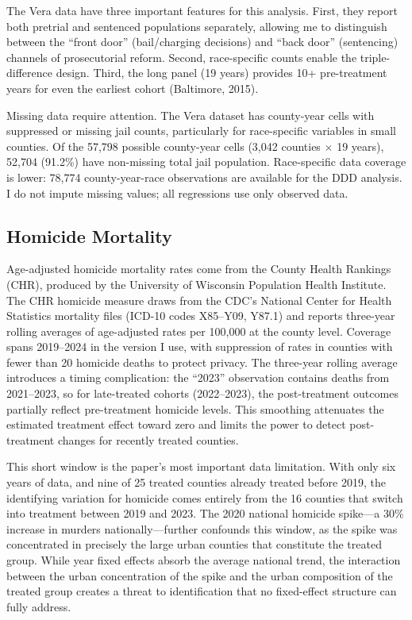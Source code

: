 \documentclass[12pt]{article}
\begin{document}
The Vera data have three important features for this analysis. First, they report both pretrial and sentenced populations separately, allowing me to distinguish between the ``front door'' (bail/charging decisions) and ``back door'' (sentencing) channels of prosecutorial reform. Second, race-specific counts enable the triple-difference design. Third, the long panel (19 years) provides 10+ pre-treatment years for even the earliest cohort (Baltimore, 2015).

Missing data require attention. The Vera dataset has county-year cells with suppressed or missing jail counts, particularly for race-specific variables in small counties. Of the 57,798 possible county-year cells (3,042 counties $\times$ 19 years), 52,704 (91.2\%) have non-missing total jail population. Race-specific data coverage is lower: 78,774 county-year-race observations are available for the DDD analysis. I do not impute missing values; all regressions use only observed data.

\subsection{Homicide Mortality}

Age-adjusted homicide mortality rates come from the County Health Rankings (CHR), produced by the University of Wisconsin Population Health Institute. The CHR homicide measure draws from the CDC's National Center for Health Statistics mortality files (ICD-10 codes X85--Y09, Y87.1) and reports three-year rolling averages of age-adjusted rates per 100,000 at the county level. Coverage spans 2019--2024 in the version I use, with suppression of rates in counties with fewer than 20 homicide deaths to protect privacy. The three-year rolling average introduces a timing complication: the ``2023'' observation contains deaths from 2021--2023, so for late-treated cohorts (2022--2023), the post-treatment outcomes partially reflect pre-treatment homicide levels. This smoothing attenuates the estimated treatment effect toward zero and limits the power to detect post-treatment changes for recently treated counties.

This short window is the paper's most important data limitation. With only six years of data, and nine of 25 treated counties already treated before 2019, the identifying variation for homicide comes entirely from the 16 counties that switch into treatment between 2019 and 2023. The 2020 national homicide spike---a 30\% increase in murders nationally---further confounds this window, as the spike was concentrated in precisely the large urban counties that constitute the treated group. While year fixed effects absorb the average national trend, the interaction between the urban concentration of the spike and the urban composition of the treated group creates a threat to identification that no fixed-effect structure can fully address.
\end{document}
